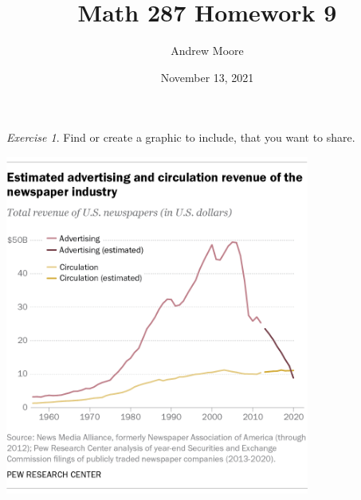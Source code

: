 \documentclass[12pt,oneside]{amsart}
\title{Math 287 Homework 9}
\author{Andrew Moore}
\date{November 13, 2021} %
\theoremstyle{remark}
\newtheorem{exer}{Exercise}
\begin{document}
\maketitle

%
%
%
%
\begin{exer}
Find or create a graphic to include, that you want to share.
\end{exer}
\begin{center}
\includegraphics[width=0.75\textwidth]{pew-newspaper-revenue.png}
\end{center}
\end{document}
